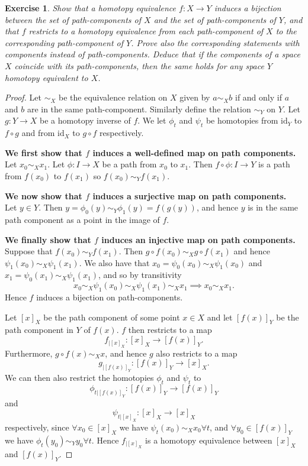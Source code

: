 \documentclass{article}
\newtheorem{exercise}{Exercise}[subsection]
\begin{document}
\begin{exercise}
Show that a homotopy equivalence $f:X\to Y$ induces a bijection between the set of path-components of $X$ and the set of path-components of $Y$, and that $f$ restricts to
a homotopy equivalence from each path-component of $X$ to the corresponding path-component of $Y$. Prove also the corresponding statements with components instead
of path-components. Deduce that if the components of a space $X$ coincide with its
path-components, then the same holds for any space $Y$ homotopy equivalent to $X$.
\end{exercise}
\begin{proof}
Let $\sim_X$ be the equivalence relation on $X$ given by $a\sim_X b$ if and only if $a$ and $b$ are in the same path-component. Similarly define the relation $\sim_Y$ on $Y$. Let $g:Y\to X$ be a homotopy inverse of $f$. We let $\phi_t$ and $\psi_t$ be homotopies from $\text{id}_Y$ to $f\circ g$ and from $\text{id}_X$ to $g\circ f$ respectively.


\textbf{We first show that $f$ induces a well-defined map on path components.}\\Let $x_0\sim_X x_1$. Let $\phi:I\to X$ be a path from $x_0$ to $x_1$. Then $f\circ\phi:I\to Y$ is a path from $f(x_0)$ to $f(x_1)$ so $f(x_0)\sim_Y f(x_1)$.

\textbf{We now show that $f$ induces a surjective map on path components.}\\Let $y\in Y$. Then $y=\phi_0(y)\sim_Y \phi_1(y)=f(g(y))$, and hence $y$ is in the same path component as a point in the image of $f$.

\textbf{We finally show that $f$ induces an injective map on path components.}\\ Suppose that $f(x_0)\sim_Yf(x_1)$. Then $g\circ f(x_0)\sim_X g\circ f(x_1)$ and hence $\psi_1(x_0)\sim_X\psi_1(x_1)$. We also have that $x_0=\psi_0(x_0)\sim_X\psi_1(x_0)$ and $x_1=\psi_0(x_1)\sim_X\psi_1(x_1)$, and so by transitivity\[x_0\sim_X\psi_1(x_0)\sim_X\psi_1(x_1)\sim_X x_1\implies x_0\sim_X x_1.\]Hence $f$ induces a bijection on path-components.\newline

Let $[x]_X$ be the path component of some point $x\in X$ and let $[f(x)]_Y$ be the path component in $Y$ of $f(x)$. $f$ then restricts to a map \[f_{|[x]_X}:[x]_X\to [f(x)]_Y.\] Furthermore, $g\circ f(x)\sim_X x$, and hence $g$ also restricts to a map \[g_{|[f(x)]_Y}:[f(x)]_Y\to[x]_X.\] We can then also restrict the homotopies $\phi_t$ and $\psi_t$ to \[\phi_{t|[f(x)]_Y}:[f(x)]_Y\to[f(x)]_Y\] and \[\psi_{t|[x]_X}:[x]_X\to[x]_X\] respectively, since $\forall x_0\in[x]_X$ we have $\psi_t(x_0)\sim_Xx_0\forall t$, and $\forall y_0\in[f(x)]_Y$ we have $\phi_t(y_0)\sim_Y y_0\forall t$. Hence $f_{|[x]_X}$ is a homotopy equivalence between $[x]_X$ and $[f(x)]_Y$.


\end{proof}
\end{document}
